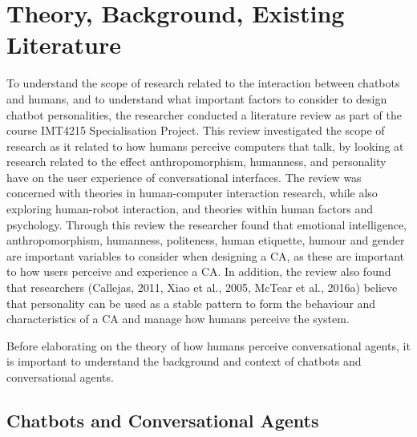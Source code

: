 \chapter{Theory, Background, Existing Literature}
\label{chap:background}

To understand the scope of research related to the interaction between chatbots and humans, and to understand what important factors to consider to design chatbot personalities, the researcher conducted a literature review as part of the course IMT4215 Specialisation Project. This review investigated the scope of research as it related to how humans perceive computers that talk, by looking at research related to the effect anthropomorphism, humanness, and personality have on the user experience of conversational interfaces. The review was concerned with theories in human-computer interaction research, while also exploring human-robot interaction, and theories within human factors and psychology. Through this review the researcher found that emotional intelligence, anthropomorphism, humanness, politeness, human etiquette, humour and gender are important variables to consider when designing a CA, as these are important to how users perceive and experience a CA. In addition, the review also found that researchers \citep{callejas2011,Xiao2005,McTear2016a} (Callejas, 2011, Xiao et al., 2005, McTear et al., 2016a) believe that personality can be used as a stable pattern to form the behaviour and characteristics of a CA and manage how humans perceive the system. 

Before elaborating on the theory of how humans perceive conversational agents, it is important to understand the background and context of chatbots and conversational agents.

\section{Chatbots and Conversational Agents}

